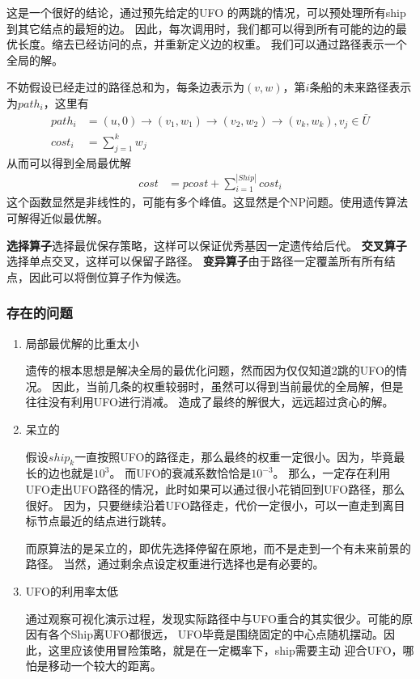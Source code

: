 \documentclass[hyperref,UTF8]{ctexart}
\theoremstyle{definition}
\theoremstyle{remark}
\numberwithin{equation}{subsection}
\newcommand{\Emph}{\textbf}
\begin{document}
	这是一个很好的结论，通过预先给定的UFO 的两跳的情况，可以预处理所有ship到其它结点的最短的边。
	因此，每次调用时，我们都可以得到所有可能的边的最优长度。缩去已经访问的点，并重新定义边的权重。
	我们可以通过路径表示一个全局的解。
	
	不妨假设已经走过的路径总和为，每条边表示为$(v, w)$，第$i$条船的未来路径表示为$path_i$，这里有
	\begin{align}
		path_i &= (u, 0) \rightarrow (v_1, w_1) \rightarrow (v_2, w_2) \rightarrow (v_k, w_k), v_j \in \bar{U}	\\
		cost_i &= \sum_{j=1}^{k} w_j
	\end{align}
	从而可以得到全局最优解
	\begin{align}
		cost &= pcost + \sum_{i=1}^{|Ship|} cost_i
	\end{align}
	这个函数显然是非线性的，可能有多个峰值。这显然是个NP问题。使用遗传算法可解得近似最优解。
	
	\Emph{选择算子}选择最优保存策略，这样可以保证优秀基因一定遗传给后代。
	\Emph{交叉算子}选择单点交叉，这样可以保留子路径。
	\Emph{变异算子}由于路径一定覆盖所有所有结点，因此可以将倒位算子作为候选。
	
\subsubsection{存在的问题}

	\begin{enumerate}[(1)]
		
		\item 局部最优解的比重太小
		
		遗传的根本思想是解决全局的最优化问题，然而因为仅仅知道2跳的UFO的情况。
		因此，当前几条的权重较弱时，虽然可以得到当前最优的全局解，但是往往没有利用UFO进行消减。
		造成了最终的解很大，远远超过贪心的解。
		
		\item 呆立的
		
		假设$ship_k$一直按照UFO的路径走，那么最终的权重一定很小。因为，毕竟最长的边也就是$10^3$。
		而UFO的衰减系数恰恰是$10^{-3}$。
		那么，一定存在利用UFO走出UFO路径的情况，此时如果可以通过很小花销回到UFO路径，那么很好。
		因为，只要继续沿着UFO路径走，代价一定很小，可以一直走到离目标节点最近的结点进行跳转。
		
		而原算法的是呆立的，即优先选择停留在原地，而不是走到一个有未来前景的路径。
		当然，通过剩余点设定权重进行选择也是有必要的。
		
		\item UFO的利用率太低
		
		通过观察可视化演示过程，发现实际路径中与UFO重合的其实很少。可能的原因有各个Ship离UFO都很远，
		UFO毕竟是围绕固定的中心点随机摆动。因此，这里应该使用冒险策略，就是在一定概率下，ship需要主动
		迎合UFO，哪怕是移动一个较大的距离。
		
		
	\end{enumerate}
\end{document}
